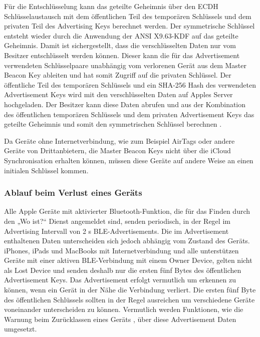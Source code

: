 Für die Entschlüsselung kann das geteilte Geheimnis über den \ac{ECDH} Schlüsselaustausch mit dem öffentlichen Teil des temporären Schlüssels und dem privaten Teil des Advertising Keys berechnet werden.
Der symmetrische Schlüssel entsteht wieder durch die Anwendung der ANSI X9.63-\ac{KDF} auf das geteilte Geheimnis.
Damit ist sichergestellt, dass die verschlüsselten Daten nur vom Besitzer entschlüsselt werden können.
Dieser kann die für das Advertisement verwendeten Schlüsselpaare unabhängig vom verlorenen Gerät aus dem Master Beacon Key ableiten und hat somit Zugriff auf die privaten Schlüssel.
Der öffentliche Teil des temporären Schlüssels und ein \ac{SHA}-256 Hash des verwendeten Advertisement Keys wird mit den verschlüsselten Daten auf Apples Server hochgeladen.
Der Besitzer kann diese Daten abrufen und aus der Kombination des öffentlichen temporären Schlüssels und dem privaten Advertisement Keys das geteilte Geheimnis und somit den symmetrischen Schlüssel berechnen \cite{Heinrich_FindMy}.

Da Geräte ohne Internetverbindung, wie zum Beispiel AirTags oder andere Geräte von Drittanbietern, die Master Beacon Keys nicht über die iCloud Synchronisation erhalten können, müssen diese Geräte auf andere Weise an einen initialen Schlüssel kommen.

\subsubsection{Ablauf beim Verlust eines Geräts}
\label{sec:Verlust}

Alle Apple Geräte mit aktivierter Bluetooth-Funktion, die für das Finden durch den „Wo ist?“ Dienst angemeldet sind, senden periodisch, in der Regel im Advertising Intervall von 2 s \ac{BLE}-Advertisements.
Die im Advertisement enthaltenen Daten unterscheiden sich jedoch abhängig vom Zustand des Geräts.
iPhones, iPads und MacBooks mit Internetverbindung und alle unterstützen Geräte mit einer aktiven \ac{BLE}-Verbindung mit einem Owner Device, gelten nicht als Lost Device und senden deshalb nur die ersten fünf Bytes des öffentlichen Advertisement Keys.
Das Advertisement erfolgt vermutlich um erkennen zu können, wenn ein Gerät in der Nähe die Verbindung verliert.
Die ersten fünf Byte des öffentlichen Schlüssels sollten in der Regel ausreichen um verschiedene Geräte voneinander unterscheiden zu können.
Vermutlich werden Funktionen, wie die Warnung beim Zurücklassen eines Geräts \cite{Apple_FindMyWarning}, über diese Advertisement Daten umgesetzt.

